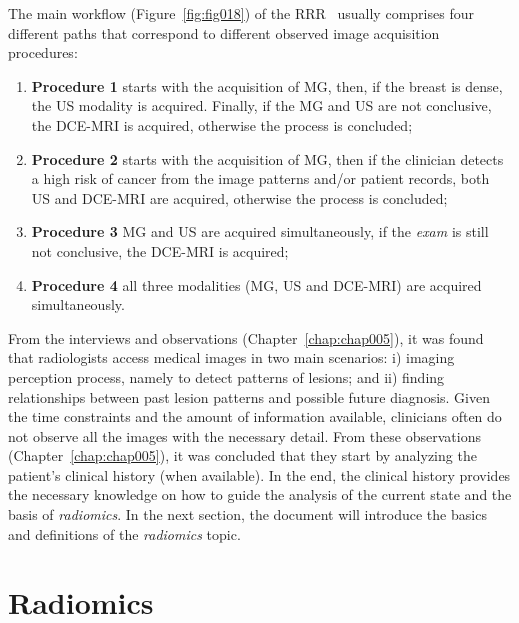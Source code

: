 \hfill

\noindent
The main workflow (Figure~\ref{fig:fig018}) of the \ac{RRR}~\cite{wagner2015analysis} usually comprises four different paths that correspond to different observed image acquisition procedures:

\begin{enumerate}
\item \textbf{Procedure 1} starts with the acquisition of \ac{MG}, then, if the breast is dense, the \ac{US} modality is acquired. Finally, if the \ac{MG} and \ac{US} are not conclusive, the \ac{DCE}-\ac{MRI} is acquired, otherwise the process is concluded;
\item \textbf{Procedure 2} starts with the acquisition of \ac{MG}, then if the clinician detects a high risk of cancer from the image patterns and/or patient records, both \ac{US} and \ac{DCE}-\ac{MRI} are acquired, otherwise the process is concluded;
\item \textbf{Procedure 3} \ac{MG} and \ac{US} are acquired simultaneously, if the {\it exam} is still not conclusive, the \ac{DCE}-\ac{MRI} is acquired;
\item \textbf{Procedure 4} all three modalities (\ac{MG}, \ac{US} and \ac{DCE}-\ac{MRI}) are acquired simultaneously.
\end{enumerate}

\hfill

From the interviews and observations (Chapter~\ref{chap:chap005}), it was found that radiologists access medical images in two main scenarios:
i) imaging perception process, namely to detect patterns of lesions;
and ii) finding relationships between past lesion patterns and possible future diagnosis.
Given the time constraints and the amount of information available, clinicians often do not observe all the images with the necessary detail.
From these observations (Chapter~\ref{chap:chap005}), it was concluded that they start by analyzing the patient's clinical history (when available).
In the end, the clinical history provides the necessary knowledge on how to guide the analysis of the current state and the basis of {\it radiomics}.
In the next section, the document will introduce the basics and definitions of the {\it radiomics} topic.

\section{Radiomics}
\label{sec:sec002006}

